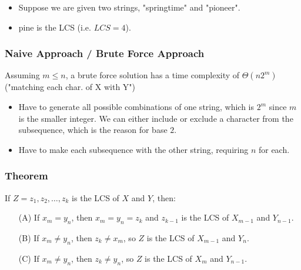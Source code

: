 \begin{example}
    \begin{itemize}
        \item Suppose we are given two strings, "springtime" and "pioneer". 
        \item pine is the LCS (i.e. $LCS=4$).
    \end{itemize}
\end{example}

\subsubsection{Naive Approach / Brute Force Approach}
\begin{intuition}
    Assuming \(m \leq n\), a brute force solution has a time complexity of \(\Theta(n 2^m)\) ("matching each char. of X with Y")
    \begin{itemize}
        \item Have to generate all possible combinations of one string, which is $2^m$ since $m$ is the smaller integer. We can either include or exclude a character from the subsequence, which is the reason for base $2$.
        \item Have to make each subsequence with the other string, requiring $n$ for each. 
    \end{itemize}
\end{intuition}

\subsubsection{Theorem}
\begin{theorem}
If \(Z = z_1, z_2, \dots, z_k\) is the LCS of \(X\) and \(Y\), then:
\begin{itemize}
    \item[(A)] If \(x_m = y_n\), then \(x_m = y_n = z_k\) and \(z_{k-1}\) is the LCS of \(X_{m-1}\) and \(Y_{n-1}\).
    \item[(B)] If \(x_m \neq y_n\), then \(z_k \neq x_m\), so \(Z\) is the LCS of \(X_{m-1}\) and \(Y_n\).
    \item[(C)] If \(x_m \neq y_n\), then \(z_k \neq y_n\), so \(Z\) is the LCS of \(X_m\) and \(Y_{n-1}\).
\end{itemize}
\end{theorem}

